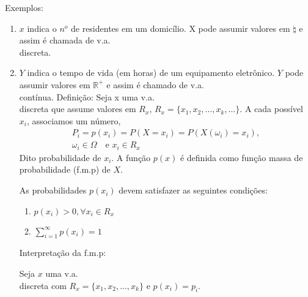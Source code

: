 \documentclass[11pt,a4paper]{book}
\begin{document}
\begin{enumerate}[label=(\alph*)]
\begin{enumerate}
Exemplos:

\begin{enumerate}[label=(\alph*)]
  \item $x$ indica o $n^o$ de residentes em um domicílio. X pode assumir valores em $\natural$ e assim é chamada de 
    v.a.\\ discreta.

  \item $Y$ indica o tempo de vida (em horas) de um equipamento eletrônico. $Y$ pode 
    assumir valores em $\mathbb{R}^+$ e assim é chamado de v.a.\\ contínua.
    Definição: Seja x uma v.a.\\ discreta que assume valores em $R_{x}$, $R_{x}=\{x_1,x_2,\dots,
    x_{k},\dots\}$. A cada possível $x_{i}$, associamos um número, 
    \begin{align*}
      P_{i}=p({x_i})=P(X={x_i})=P(X( \omega_i)=x_i),\\
      \omega_{i} \in \Omega \quad \text{e } x_{i} \in R_{x} \nonumber
    \end{align*}
    Dito probabilidade de $x_{i}$. A função $p(x)$ é definida como função massa de probabilidade 
    (f.m.p) de $X$. 

    As probabilidades $p(x_i)$ devem satisfazer as seguintes condições: 
    \begin{enumerate} %
      \item $p(x_i)>0, \forall x_i \in R_{x}$

      \item $\sum^\infty_{i=1} p(x_i)=1$
    \end{enumerate}
    Interpretação da f.m.p: 

    Seja $x$ uma v.a.\\ discreta com $R_{x}= \{x_1,x_2,\dots,x_k \}$ e $p(x_i)=p_i$.


\end{enumerate}
\end{enumerate}
\end{enumerate}
\end{document}
